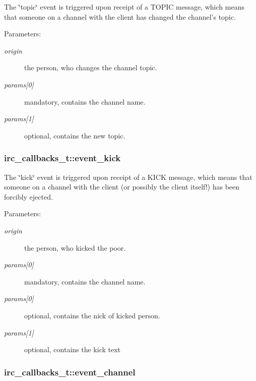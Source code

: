 The \char`\"{}topic\char`\"{} event is triggered upon receipt of a TOPIC message, which means that someone on a channel with the client has changed the channel's topic.

\begin{Desc}
\item[Parameters:]
\begin{description}
\item[{\em origin}]the person, who changes the channel topic. \item[{\em params\mbox{[}0\mbox{]}}]mandatory, contains the channel name. \item[{\em params\mbox{[}1\mbox{]}}]optional, contains the new topic. \end{description}
\end{Desc}
\hypertarget{structirc__callbacks__t_1a8194bfdbf2622e9384fbd1ac1a67d7}{
\subsubsection[event\_\-kick]{ {\bf irc\_\-callbacks\_\-t::event\_\-kick}}}
\label{structirc__callbacks__t_1a8194bfdbf2622e9384fbd1ac1a67d7}


The \char`\"{}kick\char`\"{} event is triggered upon receipt of a KICK message, which means that someone on a channel with the client (or possibly the client itself!) has been forcibly ejected.

\begin{Desc}
\item[Parameters:]
\begin{description}
\item[{\em origin}]the person, who kicked the poor. \item[{\em params\mbox{[}0\mbox{]}}]mandatory, contains the channel name. \item[{\em params\mbox{[}0\mbox{]}}]optional, contains the nick of kicked person. \item[{\em params\mbox{[}1\mbox{]}}]optional, contains the kick text \end{description}
\end{Desc}
\hypertarget{structirc__callbacks__t_87d4401073ce8dba9a43fcbcaa20d341}{
\subsubsection[event\_\-channel]{ {\bf irc\_\-callbacks\_\-t::event\_\-channel}}}
\label{structirc__callbacks__t_87d4401073ce8dba9a43fcbcaa20d341}


